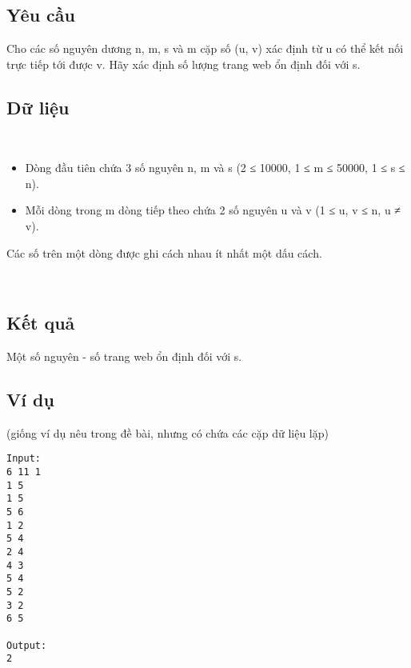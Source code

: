 \subsection{Yêu cầu}

Cho các số nguyên dương n, m, s và m cặp số (u, v) xác định từ u có thể kết nối trực tiếp tới được v. Hãy xác định số lượng trang web ổn định đối với s.

\subsection{Dữ liệu}

 
\begin{itemize}
	\item Dòng đầu tiên chứa 3 số nguyên n, m và s (2 ≤ 10000, 1 ≤ m ≤ 50000, 1 ≤ s ≤ n).
	\item Mỗi dòng trong m dòng tiếp theo chứa 2 số nguyên u và v (1 ≤ u, v ≤ n, u ≠ v).
\end{itemize}




Các số trên một dòng được ghi cách nhau ít nhất một dấu cách.

 

\subsection{Kết quả}

Một số nguyên - số trang web ổn định đối với s.

\subsection{Ví dụ}




(giống ví dụ nêu trong đề bài, nhưng có chứa các cặp dữ liệu lặp)
\begin{verbatim}
Input:
6 11 1
1 5
1 5
5 6
1 2
5 4
2 4
4 3
5 4
5 2
3 2
6 5

Output:
2
\end{verbatim}

